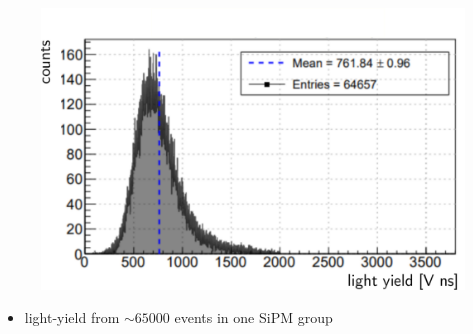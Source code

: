 \documentclass[aspectratio=169]{beamer}
\begin{document}
	
	\begin{frame}
		\centering
		\begin{figure}
			\includegraphics[width=.5\textwidth]{pictures/light_yield.pdf}
		\end{figure}
	\begin{itemize}
		\item light-yield from $ \sim \num{65000}$ events in one SiPM group
	\end{itemize}
	\end{frame}
\end{document}
